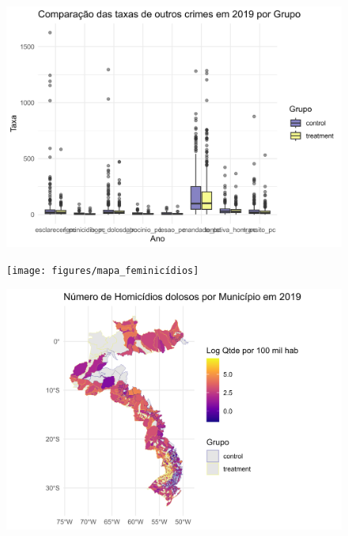 \documentclass{beamer}
\begin{document}
\begin{frame}
	\begin{figure}
		\centering
		\includegraphics[width=1\linewidth]{figures/boxplot_outros_nonzero}
		\label{fig:histoghom}
	\end{figure}
\end{frame}

\begin{frame}
	\begin{figure}
		\centering
		\texttt{[image: figures/mapa\_feminicídios]}
		\label{fig:histoghom}
	\end{figure}
\end{frame}

\begin{frame}
	\begin{figure}
		\centering
		\includegraphics[width=1\linewidth]{figures/mapa_hom_dolosos}
		\label{fig:histoghom}
	\end{figure}
\end{frame}
\end{document}
